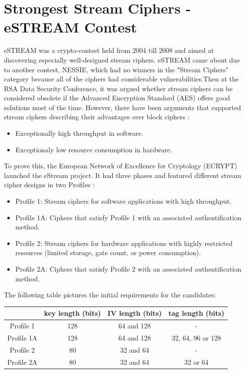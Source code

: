 \section{Strongest Stream Ciphers - eSTREAM Contest}

eSTREAM was a crypto-contest held from 2004 till 2008 and aimed at discovering especially well-designed stream ciphers. eSTREAM came about due to another contest, NESSIE, which had no winners in the "Stream Ciphers" category because all of the ciphers had considerable vulnerabilities.Then at the RSA Data Security Conference, it was argued whether stream ciphers can be considered obsolete if the Advanced Encryption Standard (AES) offers good solutions most of the time. However, there have been arguments that supported stream ciphers describing their advantages over block ciphers \cite{robshaw2008estream}:
\begin{itemize}
	\setlength\itemsep{0.1em}
	\item Exceptionally high throughput in software.
	\item Exceptionaly low resource consumption in hardware.
\end{itemize}
To prove this, the European Network of Excellence for Cryptology (ECRYPT) launched the eStream project. It had three phases and featured different stream cipher designs in two Profiles \cite{robshaw2008estream}:
\begin{itemize}
	\item[] Profile 1: Stream ciphers for software applications with high throughput.
	\item[] Profile 1A: Ciphers that satisfy Profile 1 with an associated authentification method.
	\item[] Profile 2: Stream ciphers for hardware applications with highly restricted resources (limited storage, gate count, or power consumption).
	\item[] Profile 2A: Ciphers that satisfy Profile 2 with an associated authentification method.
\end{itemize}

The following table pictures the initial requirements for the candidates:
\begin{table}[h!]
	\centering
	\begin{tabular}{| c c c c|} 
		\hline
		& key length (bits) & IV length (bits) & tag length (bits) \\ [0.5ex] 
		\hline
		Profile 1 & 128 & 64 and 128 & - \\ 
		Profile 1A & 128 & 64 and 128 & 32, 64, 96 or 128 \\
		Profile 2 & 80 & 32 and 64 & - \\
		Profile 2A & 80 & 32 and 64 & 32 or 64 \\[1ex] 
		\hline
	\end{tabular}
	\label{table:Initial requirements for the candidates}
\end{table}

